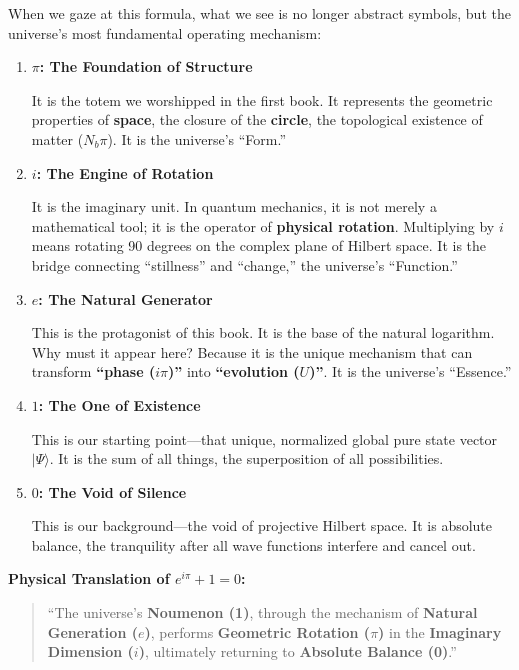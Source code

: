 \documentclass[11pt,a4paper,twoside]{book}
\begin{document}
When we gaze at this formula, what we see is no longer abstract symbols, but the universe's most fundamental operating mechanism:

\begin{enumerate}
\item \textbf{$\pi$: The Foundation of Structure}

    It is the totem we worshipped in the first book. It represents the geometric properties of \textbf{space}, the closure of the \textbf{circle}, the topological existence of matter ($N_b\pi$). It is the universe's ``Form.''

\item \textbf{$i$: The Engine of Rotation}

    It is the imaginary unit. In quantum mechanics, it is not merely a mathematical tool; it is the operator of \textbf{physical rotation}. Multiplying by $i$ means rotating 90 degrees on the complex plane of Hilbert space. It is the bridge connecting ``stillness'' and ``change,'' the universe's ``Function.''

\item \textbf{$e$: The Natural Generator}

    This is the protagonist of this book. It is the base of the natural logarithm. Why must it appear here? Because it is the unique mechanism that can transform \textbf{``phase ($i\pi$)''} into \textbf{``evolution ($U$)''}. It is the universe's ``Essence.''

\item \textbf{$1$: The One of Existence}

    This is our starting point---that unique, normalized global pure state vector $|\Psi\rangle$. It is the sum of all things, the superposition of all possibilities.

\item \textbf{$0$: The Void of Silence}

    This is our background---the void of projective Hilbert space. It is absolute balance, the tranquility after all wave functions interfere and cancel out.
\end{enumerate}

\textbf{Physical Translation of $e^{i\pi} + 1 = 0$:}

\begin{quote}
``The universe's \textbf{Noumenon (1)}, through the mechanism of \textbf{Natural Generation ($e$)}, performs \textbf{Geometric Rotation ($\pi$)} in the \textbf{Imaginary Dimension ($i$)}, ultimately returning to \textbf{Absolute Balance (0)}.''
\end{quote}
\end{document}
